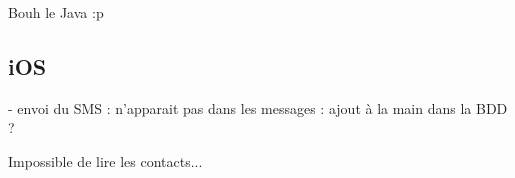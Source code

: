 Bouh le Java :p
\\




\subsection{iOS}

- envoi du SMS : n'apparait pas dans les messages : ajout à la main dans la BDD ?



Impossible de lire les contacts...
\\